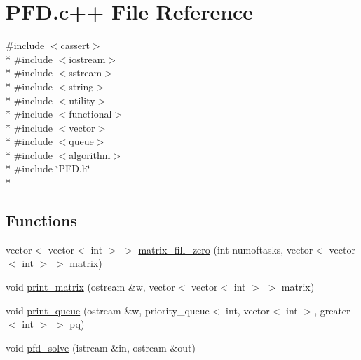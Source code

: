 \hypertarget{PFD_8c_09_09}{\section{P\-F\-D.\-c++ File Reference}
\label{PFD_8c_09_09}
}
{\ttfamily \#include $<$cassert$>$}\\*
{\ttfamily \#include $<$iostream$>$}\\*
{\ttfamily \#include $<$sstream$>$}\\*
{\ttfamily \#include $<$string$>$}\\*
{\ttfamily \#include $<$utility$>$}\\*
{\ttfamily \#include $<$functional$>$}\\*
{\ttfamily \#include $<$vector$>$}\\*
{\ttfamily \#include $<$queue$>$}\\*
{\ttfamily \#include $<$algorithm$>$}\\*
{\ttfamily \#include \char`\"{}P\-F\-D.\-h\char`\"{}}\\*
\subsection*{Functions}
\begin{DoxyCompactItemize}
\item 
vector$<$ vector$<$ int $>$ $>$ \hyperlink{PFD_8c_09_09_a93a8416bcb33dc2e804292bd9690cac1}{matrix\-\_\-fill\-\_\-zero} (int numoftasks, vector$<$ vector$<$ int $>$ $>$ matrix)
\item 
void \hyperlink{PFD_8c_09_09_a53acc0999a893c0790d583a9ad81f824}{print\-\_\-matrix} (ostream \&w, vector$<$ vector$<$ int $>$ $>$ matrix)
\item 
void \hyperlink{PFD_8c_09_09_ae0375d75ae9d38e862391827f3033711}{print\-\_\-queue} (ostream \&w, priority\-\_\-queue$<$ int, vector$<$ int $>$, greater$<$ int $>$ $>$ pq)
\item 
void \hyperlink{PFD_8c_09_09_a6584b134df3d4e68732be7089136c17e}{pfd\-\_\-solve} (istream \&in, ostream \&out)
\end{DoxyCompactItemize}



